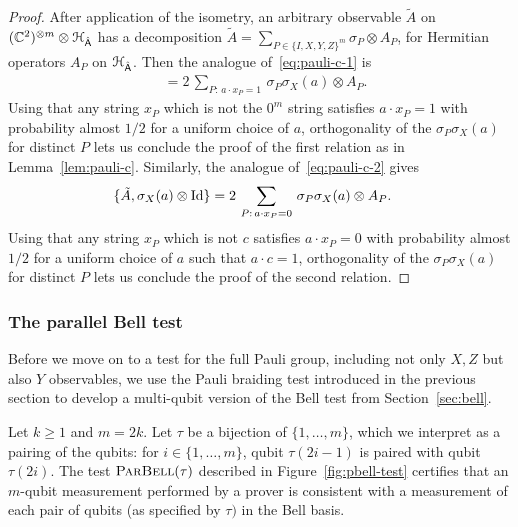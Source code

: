 \begin{proof}
After application of the isometry, an arbitrary observable $\tilde{A}$ on  $({\mathbb C}^2)^{\otimes m} \otimes \mathcal{H}_{\hat{{\textsf{A}}}}$ has a decomposition $\tilde{A} = \sum_{P\in\{I,X,Y,Z\}^m} \sigma_P \otimes A_P$, for Hermitian operators $A_P$ on $\mathcal{H}_{\hat{{\textsf{A}}}}$. 
 Then the analogue of~\eqref{eq:pauli-c-1} is
\begin{align*}
[\tilde{A},\sigma_X(a)\otimes \Id] &= 2 \,\sum_{P:\,a\cdot x_P=1} \,\sigma_P\sigma_X(a) \otimes A_P.
\end{align*} 
Using that any string $x_P$ which is not the $0^m$ string satisfies $a\cdot x_P = 1$ with probability almost $1/2$ for a uniform choice of $a$, orthogonality of the $\sigma_P\sigma_X(a) $ for distinct $P$ lets us conclude the proof of the first relation as in Lemma~\ref{lem:pauli-c}. Similarly, the analogue of~\eqref{eq:pauli-c-2} gives
\begin{align*}
\{\tilde{A},\sigma_X(a)\otimes \mathop{\rm Id}\nolimits\} &= 2 \,\sum_{P:\,a\cdot x_P=0} \,\sigma_P\sigma_X(a) \otimes A_P.
\end{align*} 
Using that any string $x_P$ which is not $c$ satisfies $a\cdot x_P = 0$ with probability almost $1/2$ for a uniform choice of $a$ such that $a\cdot c=1$, orthogonality of the $\sigma_P\sigma_X(a) $ for distinct $P$ lets us conclude the proof of the second relation.
\end{proof}


\subsubsection{The parallel Bell test}
\label{sec:perm}

Before we move on to a test for the full Pauli group, including not only $X,Z$ but also $Y$ observables, we use the Pauli braiding test introduced in the previous section to develop a multi-qubit version of the Bell test from Section~\ref{sec:bell}.

Let $k\geq 1$ and $m=2k$. Let $\tau$ be a bijection of $\{1,\ldots,m\}$, which we interpret as a pairing of the qubits: for $i\in\{1,\ldots,m\}$, qubit $\tau(2i-1)$ is paired with qubit $\tau(2i)$. 
The test $\textsc{ParBell}(\tau)$ described in Figure~\ref{fig:pbell-test} certifies that an $m$-qubit measurement performed by a prover is consistent with a measurement of each pair of qubits (as specified by $\tau)$ in the Bell basis. 

